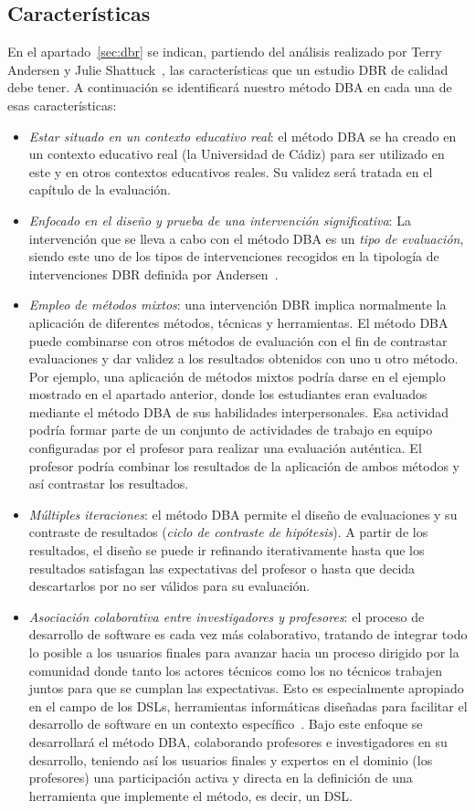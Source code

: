 \subsection{Características}

En el apartado~\ref{sec:dbr} se indican, partiendo del análisis realizado por Terry Andersen y Julie Shattuck~\cite{anderson2012design}, las características que un estudio DBR de calidad debe tener. A continuación se identificará nuestro método DBA en cada una de esas características:

\begin{itemize}
\item \emph{Estar situado en un contexto educativo real}: el método DBA se ha creado en un contexto educativo real (la Universidad de Cádiz) para ser utilizado en este y en otros contextos educativos reales. Su validez será tratada en el capítulo de la evaluación.
\item \emph{Enfocado en el diseño y prueba de una intervención significativa}: La intervención que se lleva a cabo con el método DBA es un \emph{tipo de evaluación}, siendo este uno de los tipos de intervenciones recogidos en la tipología de intervenciones DBR definida por Andersen~\cite{anderson2012design}. 
\item \emph{Empleo de métodos mixtos}: una intervención DBR implica normalmente la aplicación de diferentes métodos, técnicas y herramientas. El método DBA puede combinarse con otros métodos de evaluación con el fin de contrastar evaluaciones y dar validez a los resultados obtenidos con uno u otro método. Por ejemplo, una aplicación de métodos mixtos podría darse en el ejemplo mostrado en el apartado anterior, donde los estudiantes eran evaluados mediante el método DBA de sus habilidades interpersonales. Esa actividad podría formar parte de un conjunto de actividades de trabajo en equipo configuradas por el profesor para realizar una evaluación auténtica. El profesor podría combinar los resultados de la aplicación de ambos métodos y así contrastar los resultados.
\item \emph{Múltiples iteraciones}: el método DBA permite el diseño de evaluaciones y su contraste de resultados (\emph{ciclo de contraste de hipótesis}). A partir de los resultados, el diseño se puede ir refinando iterativamente hasta que los resultados satisfagan las expectativas del profesor o hasta que decida descartarlos por no ser válidos para su evaluación.
\item \emph{Asociación colaborativa entre investigadores y profesores}: el proceso de desarrollo de software es cada vez más colaborativo, tratando de integrar todo lo posible a los usuarios finales para avanzar hacia un proceso dirigido por la comunidad donde tanto los actores técnicos como los no técnicos trabajen juntos para que se cumplan las expectativas. Esto es especialmente apropiado en el campo de los DSLs, herramientas informáticas diseñadas para facilitar el desarrollo de software en un contexto específico~\cite{izquierdo2012community}. Bajo este enfoque se desarrollará el método DBA, colaborando profesores e investigadores en su desarrollo, teniendo así los usuarios finales y expertos en el dominio (los profesores) una participación activa y directa en la definición de una herramienta que implemente el método, es decir, un DSL. 

\end{itemize}
